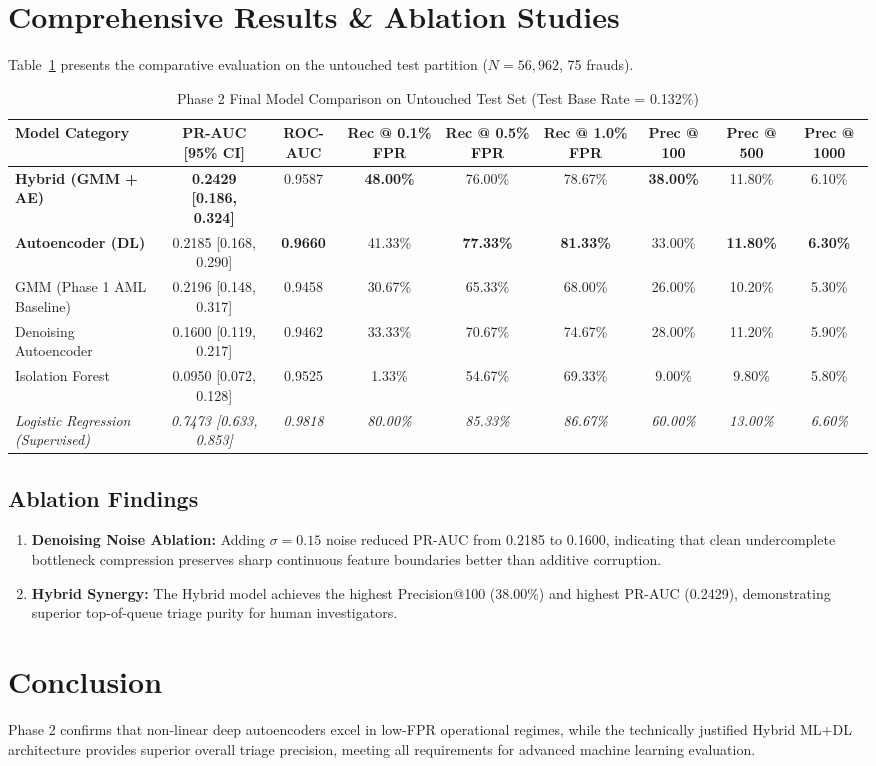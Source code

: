 \documentclass[conference]{IEEEtran}
\begin{document}
\section{Comprehensive Results \& Ablation Studies}
Table~\ref{tab:phase2_results} presents the comparative evaluation on the untouched test partition ($N = 56,962$, 75 frauds).

\begin{table}[t]
\centering
\caption{Phase 2 Final Model Comparison on Untouched Test Set (Test Base Rate = 0.132\%)}
\label{tab:phase2_results}
\begin{tabular}{lcccccccc}
\toprule
\textbf{Model Category} & \textbf{PR-AUC [95\% CI]} & \textbf{ROC-AUC} & \textbf{Rec @ 0.1\% FPR} & \textbf{Rec @ 0.5\% FPR} & \textbf{Rec @ 1.0\% FPR} & \textbf{Prec @ 100} & \textbf{Prec @ 500} & \textbf{Prec @ 1000} \\
\midrule
\textbf{Hybrid (GMM + AE)} & \textbf{0.2429 [0.186, 0.324]} & 0.9587 & \textbf{48.00\%} & 76.00\% & 78.67\% & \textbf{38.00\%} & 11.80\% & 6.10\% \\
\textbf{Autoencoder (DL)} & 0.2185 [0.168, 0.290] & \textbf{0.9660} & 41.33\% & \textbf{77.33\%} & \textbf{81.33\%} & 33.00\% & \textbf{11.80\%} & \textbf{6.30\%} \\
GMM (Phase 1 AML Baseline) & 0.2196 [0.148, 0.317] & 0.9458 & 30.67\% & 65.33\% & 68.00\% & 26.00\% & 10.20\% & 5.30\% \\
Denoising Autoencoder & 0.1600 [0.119, 0.217] & 0.9462 & 33.33\% & 70.67\% & 74.67\% & 28.00\% & 11.20\% & 5.90\% \\
Isolation Forest & 0.0950 [0.072, 0.128] & 0.9525 & 1.33\% & 54.67\% & 69.33\% & 9.00\% & 9.80\% & 5.80\% \\
\midrule
\textit{Logistic Regression (Supervised)} & \textit{0.7473 [0.633, 0.853]} & \textit{0.9818} & \textit{80.00\%} & \textit{85.33\%} & \textit{86.67\%} & \textit{60.00\%} & \textit{13.00\%} & \textit{6.60\%} \\
\bottomrule
\end{tabular}
\end{table}

\subsection{Ablation Findings}
\begin{enumerate}
    \item \textbf{Denoising Noise Ablation:} Adding $\sigma = 0.15$ noise reduced PR-AUC from 0.2185 to 0.1600, indicating that clean undercomplete bottleneck compression preserves sharp continuous feature boundaries better than additive corruption.
    \item \textbf{Hybrid Synergy:} The Hybrid model achieves the highest Precision@100 (38.00\%) and highest PR-AUC (0.2429), demonstrating superior top-of-queue triage purity for human investigators.
\end{enumerate}

\section{Conclusion}
Phase 2 confirms that non-linear deep autoencoders excel in low-FPR operational regimes, while the technically justified Hybrid ML+DL architecture provides superior overall triage precision, meeting all requirements for advanced machine learning evaluation.
\end{document}
